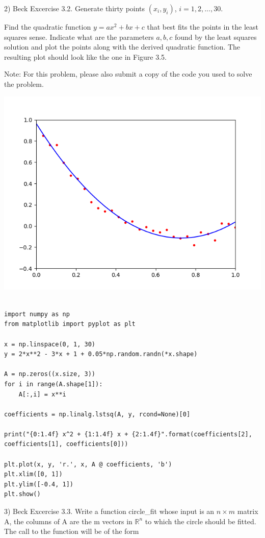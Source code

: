 \documentclass{article}
\newcommand{\RR}{\mathbb{R}}
\begin{document}
2) Beck Excercise 3.2. Generate thirty points $(x_i, y_i)$,
$i = 1, 2, ..., 30$.

Find the quadratic function $y = ax^2 + bx + c$ that best fits the points
in the least squares sense. Indicate what are the parameters $a, b, c$
found by the least squares solution and plot the points along with the derived
quadratic function. The resulting plot should look like the one in Figure 3.5.

Note: For this problem, please also submit a copy of the code you used to solve the problem.

\includegraphics{problem_3_2_plot}


\begin{lstlisting}

import numpy as np
from matplotlib import pyplot as plt

x = np.linspace(0, 1, 30)
y = 2*x**2 - 3*x + 1 + 0.05*np.random.randn(*x.shape)

A = np.zeros((x.size, 3))
for i in range(A.shape[1]):
    A[:,i] = x**i

coefficients = np.linalg.lstsq(A, y, rcond=None)[0]

print("{0:1.4f} x^2 + {1:1.4f} x + {2:1.4f}".format(coefficients[2], coefficients[1], coefficients[0]))

plt.plot(x, y, 'r.', x, A @ coefficients, 'b')
plt.xlim([0, 1])
plt.ylim([-0.4, 1])
plt.show()

\end{lstlisting}



3) Beck Excercise 3.3. Write a function circle\_fit whose input is an $n \times m$ matrix
A, the columns of A are the m vectors in $\RR^n$ to which the circle should be fitted.
The call to the function will be of the form
\end{document}
